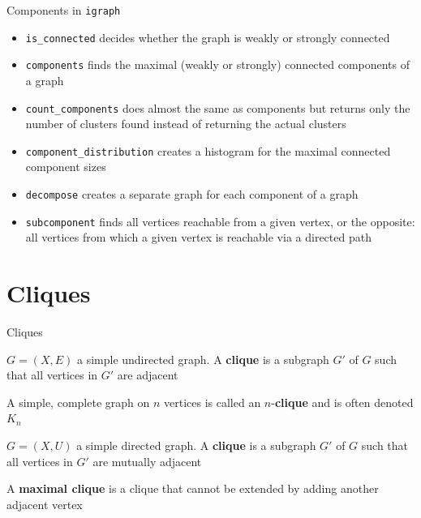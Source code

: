 \documentclass[aspectratio=43]{beamer}
\begin{document}
\begin{frame}{Components in {\tt igraph}}
\begin{itemize}
	\item {\tt is\_connected} decides whether the graph is weakly or strongly connected
	\item {\tt components} finds the maximal (weakly or strongly) connected components of a graph
	\item {\tt count\_components} does almost the same as components but returns only the number of clusters found instead of returning the actual clusters
	\item {\tt component\_distribution} creates a histogram for the maximal connected component sizes
	\item {\tt decompose} creates a separate graph for each component of a graph
	\item {\tt subcomponent} finds all vertices reachable from a given vertex, or the opposite: all vertices from which a given vertex is reachable via a directed path
\end{itemize}
\end{frame}
	
\section{Cliques}

\begin{frame}{Cliques}
	\begin{definition}
		$G=(X,E)$ a simple undirected graph. A \textbf{clique} is a subgraph $G'$ of $G$ such that all vertices in $G'$ are adjacent
	\end{definition}
	\begin{definition}[$n$-clique]
		A simple, complete graph on $n$ vertices is called an $n$-\textbf{clique} and is often denoted $K_n$
	\end{definition}
	\begin{definition}
		$G=(X,U)$ a simple directed graph. A \textbf{clique} is a subgraph $G'$ of $G$ such that all vertices in $G'$ are mutually adjacent
	\end{definition}
	\begin{definition}
		A \textbf{maximal clique} is a clique that cannot be extended by adding another adjacent vertex
	\end{definition}
\end{frame}
\end{document}
